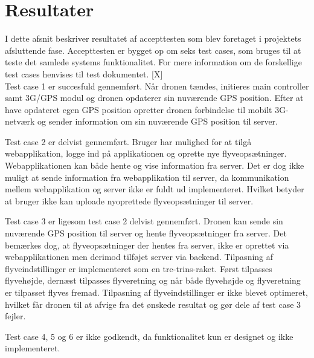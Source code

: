 \section{Resultater}

I dette afsnit beskriver resultatet af accepttesten som blev foretaget i projektets afsluttende fase. 
Accepttesten er bygget op om seks test cases, som bruges til at teste det samlede systems funktionalitet. For mere information om de forskellige test cases henvises til test dokumentet. [X] \\

Test case 1 er succesfuld gennemført. Når dronen tændes, initieres main controller samt 3G/GPS modul og dronen opdaterer sin nuværende GPS position. Efter at have opdateret egen GPS position opretter dronen forbindelse til mobilt 3G-netværk og sender information om sin nuværende GPS position til server.

Test case 2 er delvist gennemført. Bruger har mulighed for at tilgå webapplikation, logge ind på applikationen og oprette nye flyveopsætninger. Webapplikationen kan både hente og vise information fra server. Det er dog ikke muligt at sende information fra webapplikation til server, da kommunikation mellem webapplikation og server ikke er fuldt ud implementeret. Hvilket betyder at bruger ikke kan uploade nyoprettede flyveopsætninger til server.  

Test case 3 er ligesom test case 2 delvist gennemført. Dronen kan sende sin nuværende GPS position til server og hente flyveopsætninger fra server. Det bemærkes dog, at flyveopsætninger der hentes fra server, ikke er oprettet via webapplikationen men derimod tilføjet server via backend. 
Tilpasning af flyveindstillinger er implementeret som en tre-trins-raket. Først tilpasses flyvehøjde, dernæst tilpasses flyveretning og når både flyvehøjde og flyveretning er tilpasset flyves fremad.
Tilpasning af flyveindstillinger er ikke blevet optimeret, hvilket får dronen til at afvige fra det ønskede resultat og gør dele af test case 3 fejler.

Test case 4, 5 og 6 er ikke godkendt, da funktionalitet kun er designet og ikke implementeret.

